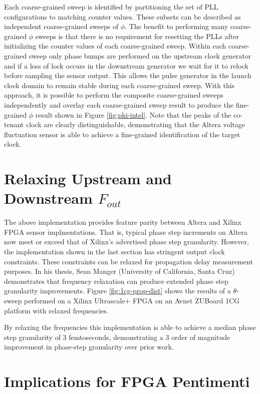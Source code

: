 Each coarse-grained sweep is identified by partitioning the set of PLL
configurations to matching counter values. These subsets can be
described as independent coarse-grained sweeps of $\phi$. The benefit to
performing many coarse-grained $\phi$ sweeps is that there is no
requirement for resetting the PLLs after initializing the counter values
of each coarse-grained sweep. Within each coarse-grained sweep only
phase bumps are performed on the upstream clock generator and if a loss
of lock occurs in the downstream generator we wait for it to relock
before sampling the sensor output. This allows the pulse generator in
the launch clock domain to remain stable during each coarse-grained
sweep. With this approach, it is possible to perform the composite
coarse-grained sweeps independently and overlay each coarse-grained
sweep result to produce the fine-grained $\phi$ result shown in Figure
\ref{fig:phi-intel}. Note that the peaks of the co-tenant clock are
clearly distinguishable, demonstrating that the Altera voltage
fluctuation sensor is able to achieve a fine-grained identification of
the target clock.

\section{Relaxing Upstream and Downstream $F_{out}$}
\label{sec:cascaded-clock-relaxation}



The above implementation provides feature parity between Altera and
Xilinx FPGA sensor implmentations. That is, typical phase step
increments on Altera now meet or exceed that of Xilinx's advertised
phase step granularity. However, the implementation shown in the last
section has stringent output clock constraints. These constraints can be
relaxed for propagation delay measurement purposes. In his thesis, Sean
Manger (University of California, Santa Cruz) demonstrates that
frequency relaxation can produce extended phase step granularity
improvements. Figure \ref{fig:1cg-prop-dist} shows the results of a
$\theta$-sweep performed on a Xilinx Ultrascale+ FPGA on an Avnet
ZUBoard 1CG platform with relaxed frequencies.

By relaxing the frequencies this implementation is able to achieve a
median phase step granularity of 3 femtoseconds, demonstrating a 3 order
of magnitude improvement in phase-step granularity over prior work.

\section{Implications for FPGA Pentimenti}
\label{sec:fpga-pentimenti-implications}

